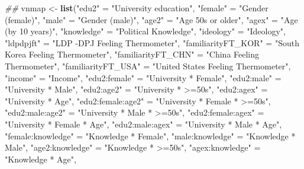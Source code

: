 \documentclass[
]{article}
\newenvironment{Shaded}{\begin{snugshade}}{\end{snugshade}}
\newcommand{\CommentTok}[1]{\textcolor[rgb]{0.56,0.35,0.01}{\textit{#1}}}
\newcommand{\KeywordTok}[1]{\textcolor[rgb]{0.13,0.29,0.53}{\textbf{#1}}}
\newcommand{\NormalTok}[1]{#1}
\newcommand{\StringTok}[1]{\textcolor[rgb]{0.31,0.60,0.02}{#1}}
\begin{document}
\begin{Shaded}
\begin{Highlighting}[]
\CommentTok{##}
\NormalTok{vnmap <-}\StringTok{ }\KeywordTok{list}\NormalTok{(}\StringTok{"edu2"}\NormalTok{ =}\StringTok{ "University education"}\NormalTok{,}
              \StringTok{"female"}\NormalTok{ =}\StringTok{ "Gender (female)"}\NormalTok{,}
              \StringTok{"male"}\NormalTok{ =}\StringTok{ "Gender (male)"}\NormalTok{,}
              \StringTok{"age2"}\NormalTok{ =}\StringTok{ "Age 50s or older"}\NormalTok{,}
              \StringTok{"agex"}\NormalTok{ =}\StringTok{ "Age (by 10 years)"}\NormalTok{,}
              \StringTok{"knowledge"}\NormalTok{ =}\StringTok{ "Political Knowledge"}\NormalTok{,}
              \StringTok{"ideology"}\NormalTok{ =}\StringTok{ "Ideology"}\NormalTok{,}
              \StringTok{"ldpdpjft"}\NormalTok{ =}\StringTok{ "LDP -DPJ Feeling Thermometer"}\NormalTok{,}
              \StringTok{"familiarityFT_KOR"}\NormalTok{ =}\StringTok{ "South Korea Feeling Thermometer"}\NormalTok{,}
              \StringTok{"familiarityFT_CHN"}\NormalTok{ =}\StringTok{ "China Feeling Thermometer"}\NormalTok{,}
              \StringTok{"familiarityFT_USA"}\NormalTok{ =}\StringTok{ "United States Feeling Thermometer"}\NormalTok{,}
              \StringTok{"income"}\NormalTok{ =}\StringTok{ "Income"}\NormalTok{,}
              \StringTok{"edu2:female"}\NormalTok{ =}\StringTok{ "University * Female"}\NormalTok{,}
              \StringTok{"edu2:male"}\NormalTok{ =}\StringTok{ "University * Male"}\NormalTok{,}
              \StringTok{"edu2:age2"}\NormalTok{ =}\StringTok{ "University * >=50s"}\NormalTok{,}
              \StringTok{"edu2:agex"}\NormalTok{ =}\StringTok{ "University * Age"}\NormalTok{,}
              \StringTok{"edu2:female:age2"}\NormalTok{ =}\StringTok{ "University * Female * >=50s"}\NormalTok{,}
              \StringTok{"edu2:male:age2"}\NormalTok{ =}\StringTok{ "University * Male * >=50s"}\NormalTok{,}
              \StringTok{"edu2:female:agex"}\NormalTok{ =}\StringTok{ "University * Female * Age"}\NormalTok{,}
              \StringTok{"edu2:male:agex"}\NormalTok{ =}\StringTok{ "University * Male * Age"}\NormalTok{,}
              \StringTok{"female:knowledge"}\NormalTok{ =}\StringTok{ "Knowledge * Female"}\NormalTok{,}
              \StringTok{"male:knowledge"}\NormalTok{ =}\StringTok{ "Knowledge * Male"}\NormalTok{,}
              \StringTok{"age2:knowledge"}\NormalTok{ =}\StringTok{ "Knowledge * >=50s"}\NormalTok{,}
              \StringTok{"agex:knowledge"}\NormalTok{ =}\StringTok{ "Knowledge * Age"}\NormalTok{,}

\end{Highlighting}
\end{Shaded}
\end{document}
